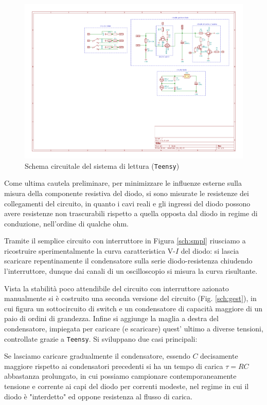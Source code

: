 \documentclass{article}[a4paper, oneside, 11pt]
\begin{document}
\begin{figure}[!htb]
	\centering 
 		\includegraphics[scale=2.2]{./measure.pdf}
 	\caption{Schema circuitale del sistema di lettura (\texttt{Teensy})
	\label{sch:rdng}}
\end{figure}
Come ultima cautela preliminare, per minimizzare le influenze esterne sulla
misura della componente resistiva del diodo, si sono misurate le resistenze dei
collegamenti del circuito, in quanto i cavi reali e gli ingressi del diodo
possono avere resistenze non trascurabili rispetto a quella opposta dal diodo
in regime di conduzione, nell'ordine di qualche ohm.

Tramite il semplice circuito con interruttore in Figura \ref{sch:smpl} riusciamo
a ricostruire sperimentalmente la curva caratteristica V-$I$ del diodo: si
lascia scaricare repentinamente il condensatore sulla serie diodo-resistenza
chiudendo l'interruttore, dunque dai canali di un oscilloscopio si misura la
curva risultante.

Vista la stabilità poco attendibile del circuito con interruttore azionato
manualmente si è costruito una seconda versione del circuito (Fig.
\ref{sch:gest}), in cui figura un sottocircuito di switch e un condensatore di
capacità maggiore di un paio di ordini di grandezza. Infine si aggiunge la
maglia a destra del condensatore, impiegata per caricare (e scaricare) quest'
ultimo a diverse tensioni, controllate grazie a \verb+Teensy+.
Si sviluppano due casi principali:

Se lasciamo caricare gradualmente il condensatore, essendo $C$ decisamente
maggiore rispetto ai condensatori precedenti si ha un tempo di carica
$\tau = RC$ abbastanza prolungato, in cui possiamo campionare contemporaneamente
tensione e corrente ai capi del diodo per correnti modeste, nel regime in cui
il diodo è "interdetto" ed oppone resistenza al flusso di carica.
\end{document}
